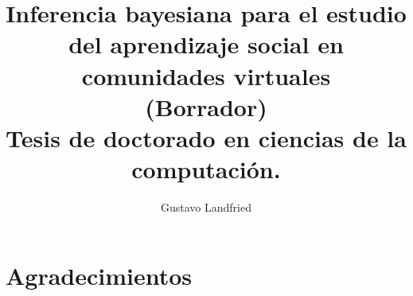 \documentclass[a4paper,10pt]{book}
\title{\huge Inferencia bayesiana para el estudio del aprendizaje social en comunidades virtuales\\[2cm]\LARGE 
(Borrador)
\\[2cm] 
Tesis de doctorado en ciencias de la computación.}
\author{Gustavo Landfried}
\makeatletter
\renewcommand{\frontmatter}{\cleardoublepage\@mainmatterfalse}
\theoremstyle{definition}
\makeatother
\begin{document}
\frontmatter
{}

\maketitle
\tableofcontents

\newpage 

\vfill
% 
% 
% 
% 


\chapter{Agradecimientos}
\end{document}

